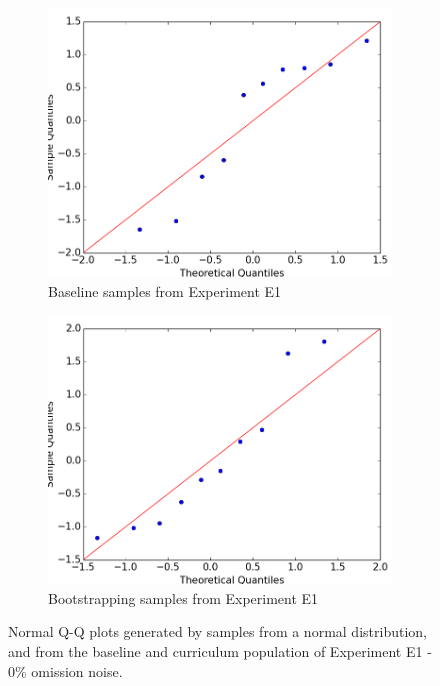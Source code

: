 \begin{figure}
\begin{subfigure}{0.38\textwidth}
\includegraphics[width=\linewidth]{figs/normality/10samples_baseline2.png}
\caption{Baseline samples from Experiment E1} \label{fig:normality_baseline}
\end{subfigure}
\hspace*{\fill} %
\begin{subfigure}{0.38\textwidth}
\includegraphics[width=\linewidth]{figs/normality/10samples_bootstrapping2.png}
\caption{Bootstrapping samples from Experiment E1} \label{fig:normality_bootstrapping}
\end{subfigure}
\caption[Normal Q-Q plot example]{Normal Q-Q plots generated by samples from a normal distribution, and from the baseline and curriculum population of Experiment E1 - 0\% omission noise. } \label{fig:normalityqq}
\end{figure}

